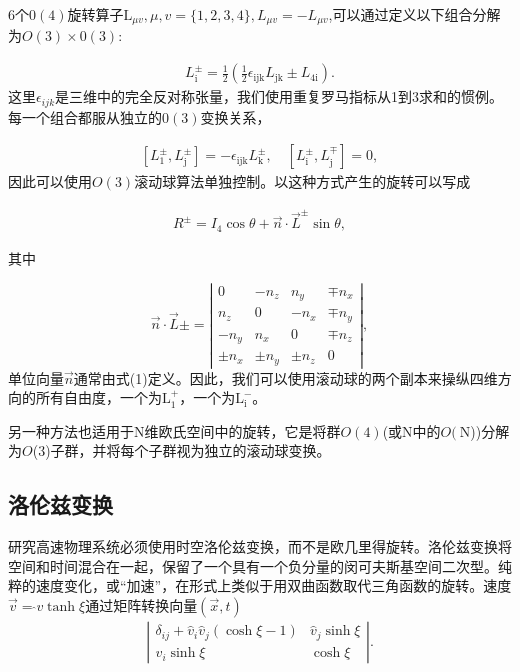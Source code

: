 \begin{CJK}{UTF8}{gbsn}
6个$0(4)$旋转算子$\mathrm{L}_{\mu v}, \mu, v=\{1,2,3,4\}, L_{\mu v}=-L_{\mu v}$,可以通过定义以下组合分解为$O (3) \times 0 (3)$:

\begin{align}
L_{\mathrm{i}}^{\pm}=\frac{1}{2}\left(\frac{1}{2} \epsilon_{\mathrm{ijk}} L_{\mathrm{jk}} \pm L_{4 \mathrm{i}}\right) .
\end{align}
这里$\epsilon_{i j k}$是三维中的完全反对称张量，我们使用重复罗马指标从1到3求和的惯例。每一个组合都服从独立的$0(3)$变换关系，

\begin{align}
\left[L_{1}^{\pm}, L_{\mathrm{j}}^{\pm}\right]=-\epsilon_{\mathrm{ijk}} L_{\mathrm{k}}^{\pm}, \quad\left[L_{\mathrm{i}}^{\pm}, L_{\mathrm{j}}^{\mp}\right]=0,
\end{align}
因此可以使用$O(3)$滚动球算法单独控制。以这种方式产生的旋转可以写成

\begin{align}
R^{\pm}=I_{4} \cos \theta+\vec{n}  \cdot \vec{L}^{\pm} \sin \theta,
\end{align}


其中

$$
\vec{n} \cdot \vec{L} \pm=\left|\begin{array}{cccc}
0 & -n_{z} & n_{y} & \mp n_{x} \\
n_{z} & 0 & -n_{x} & \mp n_{y} \\
-n_{y} & n_{x} & 0 & \mp n_{z} \\
\pm n_{x} & \pm n_{y} & \pm n_{z} & 0
\end{array}\right|,
$$
单位向量$\vec{n}$通常由式(1)定义。因此，我们可以使用滚动球的两个副本来操纵四维方向的所有自由度，一个为$\mathrm{L}_{1}^{+}$，一个为$\mathrm{L}_{\mathrm{i}}^{-}$。


另一种方法也适用于N维欧氏空间中的旋转，它是将群$O(4)$(或$\mathrm{N}$中的$O(\mathrm{~N}$))分解为$O$(3)子群，并将每个子群视为独立的滚动球变换。

\subsection*{洛伦兹变换}
研究高速物理系统必须使用时空洛伦兹变换，而不是欧几里得旋转。洛伦兹变换将空间和时间混合在一起，保留了一个具有一个负分量的闵可夫斯基空间二次型。纯粹的速度变化，或“加速”，在形式上类似于用双曲函数取代三角函数的旋转。速度$\vec{v}=\hat{} v \tanh \xi$通过矩阵转换向量$(\vec{x},t)$
\begin{align}
\left|\begin{array}{cc}
\delta_{i j}+\hat{v}_{i} \hat{v}_{j}(\cosh \xi-1) & \hat{v}_{j} \sinh \xi \\
\hat{v}_{i} \sinh \xi & \cosh \xi
\end{array}\right| .
\end{align}


\end{CJK}
